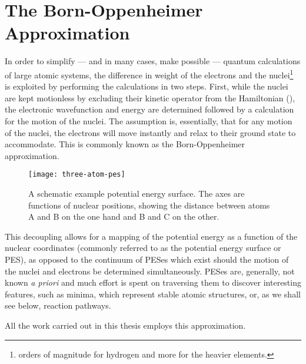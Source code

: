 \section{The Born-Oppenheimer Approximation}
\label{sec:born-oppenheimer}
In order to simplify --- and in many cases, make possible --- quantum calculations of large atomic systems, the difference in weight of the electrons and the nuclei\footnote{ orders of magnitude for hydrogen and more for the heavier elements.} is exploited by performing the calculations in two steps.
First, while the nuclei are kept motionless by excluding their kinetic operator from the Hamiltonian (), the electronic wavefunction and energy are determined followed by a calculation for the motion of the nuclei.
The assumption is, essentially, that for any motion of the nuclei, the electrons will move instantly and relax to their ground state to accommodate.
This is commonly known as the Born-Oppenheimer approximation.~\cite{born-oppenheimer-1927}

\begin{figure}[h]
  \begin{center}
    \texttt{[image: three-atom-pes]}
\parbox{0.85\linewidth}{
    \caption{
A schematic example potential energy surface.
The axes are functions of nuclear positions, showing the distance between atoms A and B on the one hand and B and C on the other.
\expand
}
\label{fig:dimer-force-overview}
}
  \end{center}
\end{figure}


This decoupling allows for a mapping of the potential energy as a function of the nuclear coordinates (commonly referred to as the potential energy surface or PES), as opposed to the continuum of PESes which exist should the motion of the nuclei and electrons be determined simultaneously.
PESes are, generally, not known \textit{a priori} and much effort is spent on traversing them to discover interesting features, such as minima, which represent stable atomic structures, or, as we shall see below, reaction pathways.


All the work carried out in this thesis employs this approximation.

